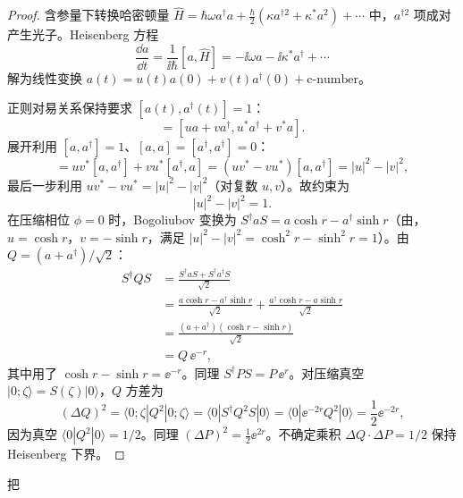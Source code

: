 \begin{proof}
含参量下转换哈密顿量 \(\hat H=\hbar\omega a^\dagger a+\frac{\hbar}{2}(\kappa a^{\dagger2}+\kappa^*a^2)+\cdots\) 中，\(a^{\dagger2}\) 项成对产生光子。Heisenberg 方程
\begin{equation*}
\frac{\dd a}{\dd t}=\frac{1}{\ii\hbar}[a,\hat H]
=-\ii\omega a-\ii\kappa^* a^\dagger+\cdots
\end{equation*}
解为线性变换 \(a(t)=u(t)a(0)+v(t)a^\dagger(0)+\text{c-number}\)。

正则对易关系保持要求 \([a(t),a^\dagger(t)]=1\)：
\begin{equation*}
[a(t),a^\dagger(t)]=[ua+va^\dagger,u^*a^\dagger+v^*a].
\end{equation*}
展开利用 \([a,a^\dagger]=1\)、\([a,a]=[a^\dagger,a^\dagger]=0\)：
\begin{equation*}
[a(t),a^\dagger(t)]=u v^*[a,a^\dagger]+v u^*[a^\dagger,a]=(uv^*-vu^*)[a,a^\dagger]=|u|^2-|v|^2,
\end{equation*}
最后一步利用 \(uv^*-vu^*=|u|^2-|v|^2\)（对复数 \(u,v\)）。故约束为
\begin{equation*}
|u|^2-|v|^2=1.
\end{equation*}
在压缩相位 \(\phi=0\) 时，Bogoliubov 变换为 \(S^\dagger a S=a\cosh r-a^\dagger\sinh r\)（由，\(u=\cosh r\)，\(v=-\sinh r\)，满足 \(|u|^2-|v|^2=\cosh^2 r-\sinh^2 r=1\)）。由 \(Q=(a+a^\dagger)/\sqrt{2}\)：
\begin{align*}
S^\dagger Q S
&=\frac{S^\dagger a S+S^\dagger a^\dagger S}{\sqrt2}
\\
&=\frac{a\cosh r-a^\dagger\sinh r}{\sqrt2}
  +\frac{a^\dagger\cosh r-a\sinh r}{\sqrt2}
\\
&=\frac{(a+a^\dagger)(\cosh r-\sinh r)}{\sqrt2}
\\
&=Q\,\ee^{-r},
\end{align*}
其中用了 \(\cosh r-\sinh r=\ee^{-r}\)。同理 \(S^\dagger P S=P\,\ee^{r}\)。对压缩真空 \(|0;\zeta\rangle=S(\zeta)|0\rangle\)，\(Q\) 方差为
\begin{equation*}
(\Delta Q)^2=\langle 0;\zeta|Q^2|0;\zeta\rangle=\langle 0|S^\dagger Q^2 S|0\rangle=\langle 0|\ee^{-2r}Q^2|0\rangle=\frac{1}{2}\ee^{-2r},
\end{equation*}
因为真空 \(\langle 0|Q^2|0\rangle=1/2\)。同理 \((\Delta P)^2=\frac{1}{2}\ee^{2r}\)。不确定乘积 \(\Delta Q\cdot\Delta P=1/2\) 保持 Heisenberg 下界。

\end{proof}

把

